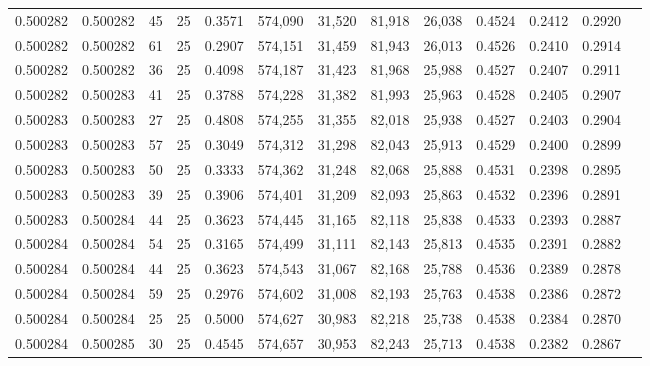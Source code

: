 \begin{tabular}{rrrrrrrrrrrrr}
0.500282 & 0.500282 &    45 &  25 &                                     0.3571 & 574,090 &  31,520 &  81,918 &  26,038 & 0.4524 & 0.2412 & 0.2920 \\
0.500282 & 0.500282 &    61 &  25 &                                     0.2907 & 574,151 &  31,459 &  81,943 &  26,013 & 0.4526 & 0.2410 & 0.2914 \\
0.500282 & 0.500282 &    36 &  25 &                                     0.4098 & 574,187 &  31,423 &  81,968 &  25,988 & 0.4527 & 0.2407 & 0.2911 \\
0.500282 & 0.500283 &    41 &  25 &                                     0.3788 & 574,228 &  31,382 &  81,993 &  25,963 & 0.4528 & 0.2405 & 0.2907 \\
0.500283 & 0.500283 &    27 &  25 &                                     0.4808 & 574,255 &  31,355 &  82,018 &  25,938 & 0.4527 & 0.2403 & 0.2904 \\
0.500283 & 0.500283 &    57 &  25 &                                     0.3049 & 574,312 &  31,298 &  82,043 &  25,913 & 0.4529 & 0.2400 & 0.2899 \\
0.500283 & 0.500283 &    50 &  25 &                                     0.3333 & 574,362 &  31,248 &  82,068 &  25,888 & 0.4531 & 0.2398 & 0.2895 \\
0.500283 & 0.500283 &    39 &  25 &                                     0.3906 & 574,401 &  31,209 &  82,093 &  25,863 & 0.4532 & 0.2396 & 0.2891 \\
0.500283 & 0.500284 &    44 &  25 &                                     0.3623 & 574,445 &  31,165 &  82,118 &  25,838 & 0.4533 & 0.2393 & 0.2887 \\
0.500284 & 0.500284 &    54 &  25 &                                     0.3165 & 574,499 &  31,111 &  82,143 &  25,813 & 0.4535 & 0.2391 & 0.2882 \\
0.500284 & 0.500284 &    44 &  25 &                                     0.3623 & 574,543 &  31,067 &  82,168 &  25,788 & 0.4536 & 0.2389 & 0.2878 \\
0.500284 & 0.500284 &    59 &  25 &                                     0.2976 & 574,602 &  31,008 &  82,193 &  25,763 & 0.4538 & 0.2386 & 0.2872 \\
0.500284 & 0.500284 &    25 &  25 &                                     0.5000 & 574,627 &  30,983 &  82,218 &  25,738 & 0.4538 & 0.2384 & 0.2870 \\
0.500284 & 0.500285 &    30 &  25 &                                     0.4545 & 574,657 &  30,953 &  82,243 &  25,713 & 0.4538 & 0.2382 & 0.2867 \\

\end{tabular}
